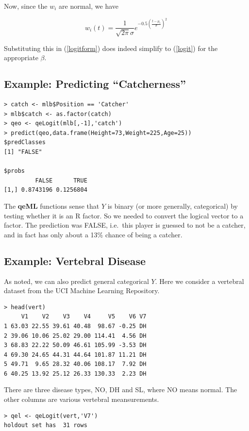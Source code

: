 Now, since the $w_i$ are normal, we have

\begin{equation}
w_i(t) = 
\frac{1}{\sqrt{2 \pi} \sigma}
e^{-0.5 \left ( \frac{t-\mu_i}{\sigma} \right )^2}
\end{equation}

Substituting this in (\ref{logitform}) does indeed simplify to
(\ref{logit}) for the appropriate $\beta$.

\subsection{Example:  Predicting ``Catcherness''}

\begin{lstlisting}
> catch <- mlb$Position == 'Catcher'
> mlb$catch <- as.factor(catch)
> qeo <- qeLogit(mlb[,-1],'catch')
> predict(qeo,data.frame(Height=73,Weight=225,Age=25))
$predClasses
[1] "FALSE"

$probs
         FALSE      TRUE
[1,] 0.8743196 0.1256804
\end{lstlisting}

The \textbf{qeML} functions sense that $Y$ is binary (or more generally,
categorical) by testing whether it is an R factor.  So we needed to
convert the logical vector to a factor.  The prediction was FALSE, i.e.\
this player is guessed to not be a catcher, and in fact has only about a
13\% chance of being a catcher.

\subsection{Example:  Vertebral Disease}

As noted, we can also predict general categorical $Y$.  Here we
consider a vertebral dataset from the UCI Machine Learning Repository.

\begin{lstlisting}
> head(vert)
     V1    V2    V3    V4     V5    V6 V7
1 63.03 22.55 39.61 40.48  98.67 -0.25 DH
2 39.06 10.06 25.02 29.00 114.41  4.56 DH
3 68.83 22.22 50.09 46.61 105.99 -3.53 DH
4 69.30 24.65 44.31 44.64 101.87 11.21 DH
5 49.71  9.65 28.32 40.06 108.17  7.92 DH
6 40.25 13.92 25.12 26.33 130.33  2.23 DH
\end{lstlisting}

There are three disease types, NO, DH and SL, where NO means normal.
The other columns are various vertebral meansurements.

\begin{lstlisting}
> qel <- qeLogit(vert,'V7')
holdout set has  31 rows
\end{lstlisting}

